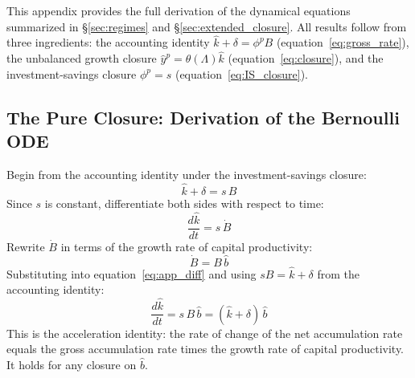 
This appendix provides the full derivation of the dynamical equations summarized in \S\ref{sec:regimes} and \S\ref{sec:extended_closure}. All results follow from three ingredients: the accounting identity $\hat{k} + \delta = \phi^p B$ (equation~\ref{eq:gross_rate}), the unbalanced growth closure $\hat{y}^p = \theta(\Lambda)\hat{k}$ (equation~\ref{eq:closure}), and the investment-savings closure $\phi^p = s$ (equation~\ref{eq:IS_closure}).


\subsection{The Pure Closure: Derivation of the Bernoulli ODE}
\label{app:bernoulli_derivation}

Begin from the accounting identity under the investment-savings closure:
%
\begin{equation}\label{eq:app_identity}
	\hat{k} + \delta = s \, B
\end{equation}
%
Since $s$ is constant, differentiate both sides with respect to time:
%
\begin{equation}\label{eq:app_diff}
	\frac{d\hat{k}}{dt} = s \, \dot{B}
\end{equation}
%
Rewrite $\dot{B}$ in terms of the growth rate of capital productivity:
%
\begin{equation}\label{eq:app_Bdot}
	\dot{B} = B \, \hat{b}
\end{equation}
%
Substituting into equation~\eqref{eq:app_diff} and using $sB = \hat{k} + \delta$ from the accounting identity:
%
\begin{equation}\label{eq:app_chain}
	\frac{d\hat{k}}{dt} = s \, B \, \hat{b} = (\hat{k} + \delta) \, \hat{b}
\end{equation}
%
This is the acceleration identity: the rate of change of the net accumulation rate equals the gross accumulation rate times the growth rate of capital productivity. It holds for any closure on $\hat{b}$.

